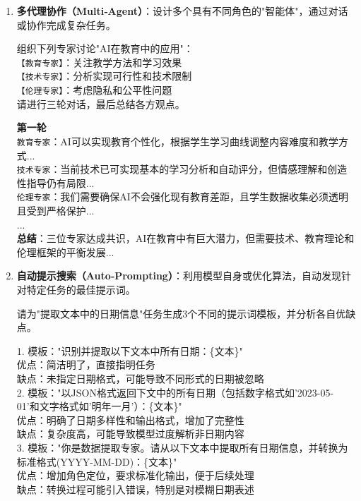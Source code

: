 \documentclass[12pt]{ctexart}
\begin{document}
\begin{enumerate}[label=\arabic*.]
  \item \textbf{多代理协作（Multi‑Agent）}：设计多个具有不同角色的"智能体"，通过对话或协作完成复杂任务。
  \begin{promptbox}
  组织下列专家讨论"AI在教育中的应用"：\\
  \texttt{【教育专家】}：关注教学方法和学习效果\\
  \texttt{【技术专家】}：分析实现可行性和技术限制\\
  \texttt{【伦理专家】}：考虑隐私和公平性问题\\
  请进行三轮对话，最后总结各方观点。
  \end{promptbox}
  \begin{outputbox}
  \textbf{第一轮}\\
  \texttt{教育专家}：AI可以实现教育个性化，根据学生学习曲线调整内容难度和教学方式...\\
  \texttt{技术专家}：当前技术已可实现基本的学习分析和自动评分，但情感理解和创造性指导仍有局限...\\
  \texttt{伦理专家}：我们需要确保AI不会强化现有教育差距，且学生数据收集必须透明且受到严格保护...\\
  ...\\
  \textbf{总结}：三位专家达成共识，AI在教育中有巨大潜力，但需要技术、教育理论和伦理框架的平衡发展...
  \end{outputbox}
  
  \item \textbf{自动提示搜索（Auto‑Prompting）}：利用模型自身或优化算法，自动发现针对特定任务的最佳提示词。
  \begin{promptbox}
  请为"提取文本中的日期信息"任务生成3个不同的提示词模板，并分析各自优缺点。
  \end{promptbox}
  \begin{outputbox}
  1. 模板："识别并提取以下文本中所有日期：\{文本\}"\\
  优点：简洁明了，直接指明任务\\
  缺点：未指定日期格式，可能导致不同形式的日期被忽略\\
  
  2. 模板："以JSON格式返回下文中的所有日期（包括数字格式如'2023-05-01'和文字格式如'明年一月'）：\{文本\}"\\
  优点：明确了日期多样性和输出格式，增加了完整性\\
  缺点：复杂度高，可能导致模型过度解析非日期内容\\
  
  3. 模板："你是数据提取专家。请从以下文本中提取所有日期信息，并转换为标准格式(YYYY-MM-DD)：\{文本\}"\\
  优点：增加角色定位，要求标准化输出，便于后续处理\\
  缺点：转换过程可能引入错误，特别是对模糊日期表述\\
  

\end{outputbox}
\end{enumerate}
\end{document}
